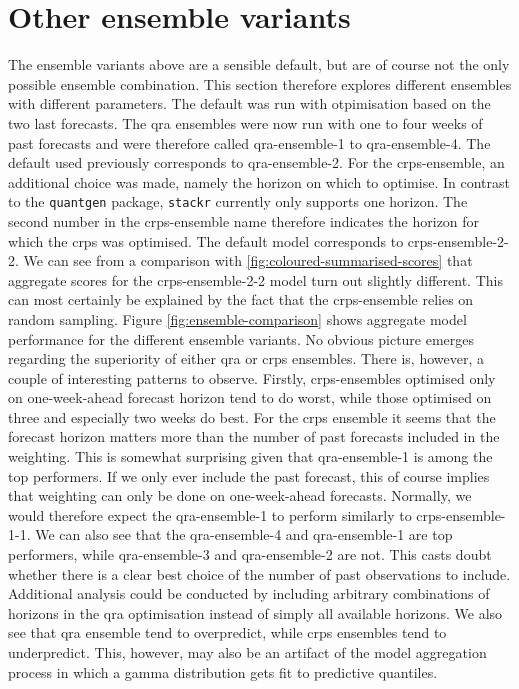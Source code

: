 \documentclass[
]{book}
\begin{document}
\hypertarget{other-ensemble-variants}{%
\section{Other ensemble variants}\label{other-ensemble-variants}}

The ensemble variants above are a sensible default, but are of course not the only possible ensemble combination. This section therefore explores different ensembles with different parameters. The default was run with otpimisation based on the two last forecasts. The qra ensembles were now run with one to four weeks of past forecasts and were therefore called qra-ensemble-1 to qra-ensemble-4. The default used previously corresponds to qra-ensemble-2. For the crps-ensemble, an additional choice was made, namely the horizon on which to optimise. In contrast to the \texttt{quantgen} package, \texttt{stackr} currently only supports one horizon. The second number in the crps-ensemble name therefore indicates the horizon for which the crps was optimised. The default model corresponds to crps-ensemble-2-2. We can see from a comparison with \ref{fig:coloured-summarised-scores} that aggregate scores for the crps-ensemble-2-2 model turn out slightly different. This can most certainly be explained by the fact that the crps-ensemble relies on random sampling.
Figure \ref{fig:ensemble-comparison} shows aggregate model performance for the different ensemble variants. No obvious picture emerges regarding the superiority of either qra or crps ensembles. There is, however, a couple of interesting patterns to observe. Firstly, crps-ensembles optimised only on one-week-ahead forecast horizon tend to do worst, while those optimised on three and especially two weeks do best. For the crps ensemble it seems that the forecast horizon matters more than the number of past forecasts included in the weighting. This is somewhat surprising given that qra-ensemble-1 is among the top performers. If we only ever include the past forecast, this of course implies that weighting can only be done on one-week-ahead forecasts. Normally, we would therefore expect the qra-ensemble-1 to perform similarly to crps-ensemble-1-1. We can also see that the qra-ensemble-4 and qra-ensemble-1 are top performers, while qra-ensemble-3 and qra-ensemble-2 are not. This casts doubt whether there is a clear best choice of the number of past observations to include. Additional analysis could be conducted by including arbitrary combinations of horizons in the qra optimisation instead of simply all available horizons. We also see that qra ensemble tend to overpredict, while crps ensembles tend to underpredict. This, however, may also be an artifact of the model aggregation process in which a gamma distribution gets fit to predictive quantiles.
\end{document}

